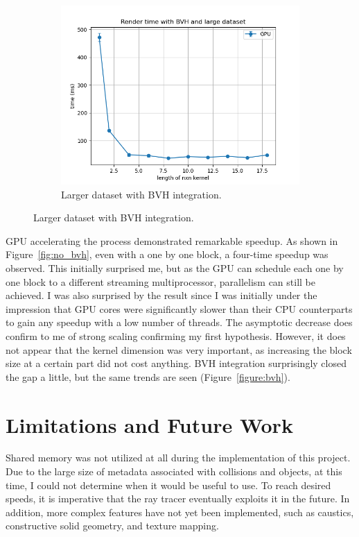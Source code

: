 \documentclass[11pt]{article}
\begin{document}
\begin{figure}
\begin{subfigure}[b]{0.3\textwidth}
    \centering
    \includegraphics[scale=.3]{world16b16.png}
    \caption{Larger dataset with BVH integration.}
    \label{figure:large}
    \end{subfigure}
\end{figure}

GPU accelerating the process demonstrated remarkable speedup. As shown in Figure~\ref{fig:no_bvh}, even with a one by one block, a four-time speedup was
observed. This initially surprised me, but as the GPU can schedule each one by one block to a different streaming multiprocessor, parallelism can still be
achieved. I was also surprised by the result since I was initially under the impression that GPU cores were significantly slower than their CPU counterparts
to gain any speedup with a low number of threads. The asymptotic decrease does confirm to me of strong scaling confirming my first hypothesis. However, it does
not appear that the kernel dimension was very important, as increasing the block size at a certain part did not cost anything. BVH integration surprisingly closed 
the gap a little, but the same trends are seen (Figure~\ref{figure:bvh}).

\section{Limitations and Future Work}
Shared memory was not utilized at all during the implementation of this project. Due to the large size of metadata associated with collisions
and objects, at this time, I could not determine when it would be useful to use. To reach desired speeds, it is imperative that the ray tracer
eventually exploits it in the future. In addition, more complex features have not yet been implemented, such as caustics, constructive solid geometry,
and texture mapping.
\end{document}
